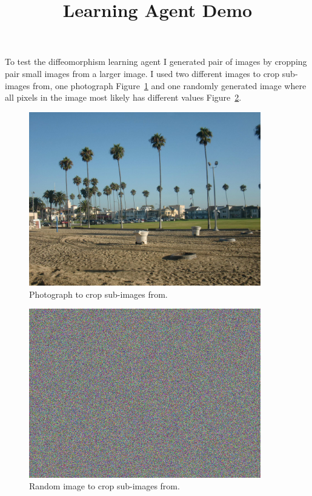 \documentclass[10pt]{report}
\title{Learning Agent Demo}
\begin{document}
To test the diffeomorphism learning agent I generated pair of images by cropping pair small images from a larger image. I used two different  images to crop sub-images from, one photograph Figure~\ref{balboa} and one randomly generated image where all pixels in the image most likely has different values Figure~\ref{random}.

\begin{figure}
\centering
\includegraphics[width=0.9\textwidth]{../diffeo_experiments/balboa.png} 
\caption{Photograph to crop sub-images from.}
\label{balboa}
\end{figure}
\begin{figure}
\centering
\includegraphics[width=0.9\textwidth]{../diffeo_experiments/randomimg.png} 
\caption{Random image to crop sub-images from.}
\label{random}
\end{figure}
\end{document}

